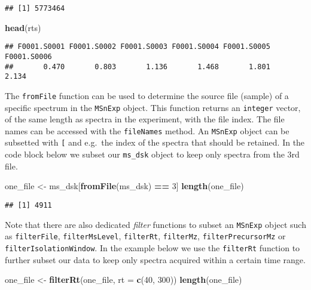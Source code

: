 \documentclass[journal=jacsat,manuscript=suppinfo]{achemso}
\newenvironment{Shaded}{\begin{snugshade}}{\end{snugshade}}
\newcommand{\DataTypeTok}[1]{\textcolor[rgb]{0.13,0.29,0.53}{#1}}
\newcommand{\DecValTok}[1]{\textcolor[rgb]{0.00,0.00,0.81}{#1}}
\newcommand{\KeywordTok}[1]{\textcolor[rgb]{0.13,0.29,0.53}{\textbf{#1}}}
\newcommand{\NormalTok}[1]{#1}
\newcommand{\OperatorTok}[1]{\textcolor[rgb]{0.81,0.36,0.00}{\textbf{#1}}}
\newcommand{\StringTok}[1]{\textcolor[rgb]{0.31,0.60,0.02}{#1}}
\begin{document}
\begin{verbatim}
## [1] 5773464
\end{verbatim}

\begin{Shaded}
\begin{Highlighting}[]
\KeywordTok{head}\NormalTok{(rts)}
\end{Highlighting}
\end{Shaded}

\begin{verbatim}
## F0001.S0001 F0001.S0002 F0001.S0003 F0001.S0004 F0001.S0005 F0001.S0006 
##       0.470       0.803       1.136       1.468       1.801       2.134
\end{verbatim}

The \texttt{fromFile} function can be used to determine the source file
(sample) of a specific spectrum in the \texttt{MSnExp} object. This
function returns an \texttt{integer} vector, of the same length as
spectra in the experiment, with the file index. The file names can be
accessed with the \texttt{fileNames} method. An \texttt{MSnExp} object
can be subsetted with \texttt{{[}} and e.g.~the index of the spectra
that should be retained. In the code block below we subset our
\texttt{ms\_dsk} object to keep only spectra from the 3rd file.

\begin{Shaded}
\begin{Highlighting}[]
\NormalTok{one\_file \textless{}{-}}\StringTok{ }\NormalTok{ms\_dsk[}\KeywordTok{fromFile}\NormalTok{(ms\_dsk) }\OperatorTok{==}\StringTok{ }\DecValTok{3}\NormalTok{]}
\KeywordTok{length}\NormalTok{(one\_file)}
\end{Highlighting}
\end{Shaded}

\begin{verbatim}
## [1] 4911
\end{verbatim}

Note that there are also dedicated \emph{filter} functions to subset an
\texttt{MSnExp} object such as \texttt{filterFile},
\texttt{filterMsLevel}, \texttt{filterRt}, \texttt{filterMz},
\texttt{filterPrecursorMz} or \texttt{filterIsolationWindow}. In the
example below we use the \texttt{filterRt} function to further subset
our data to keep only spectra acquired within a certain time range.

\begin{Shaded}
\begin{Highlighting}[]
\NormalTok{one\_file \textless{}{-}}\StringTok{ }\KeywordTok{filterRt}\NormalTok{(one\_file, }\DataTypeTok{rt =} \KeywordTok{c}\NormalTok{(}\DecValTok{40}\NormalTok{, }\DecValTok{300}\NormalTok{))}
\KeywordTok{length}\NormalTok{(one\_file)}
\end{Highlighting}
\end{Shaded}
\end{document}
